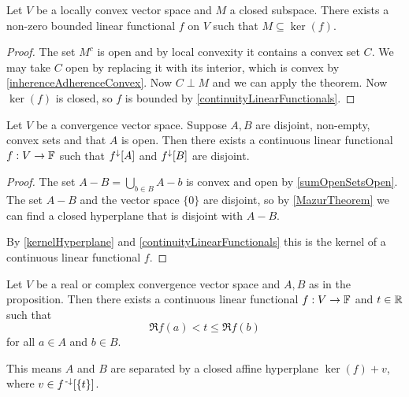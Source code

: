 \begin{corollary} \label{functionalZeroOnClosedSubSpace}
Let $V$ be a locally convex vector space and $M$ a closed subspace. There exists a non-zero bounded linear functional $f$ on $V$ such that $M\subseteq \ker(f)$.
\end{corollary}
\begin{proof}
The set $M^c$ is open and by local convexity it contains a convex set $C$. We may take $C$ open by replacing it with its interior, which is convex by \ref{inherenceAdherenceConvex}. Now $C\perp M$ and we can apply the theorem. Now $\ker(f)$ is closed, so $f$ is bounded by \ref{continuityLinearFunctionals}.
\end{proof}

\begin{theorem} \label{HahnBanachSeparation}
Let $V$ be a convergence vector space. Suppose $A,B$ are disjoint, non-empty, convex sets and that $A$ is open. Then there exists a continuous linear functional $f:V\to \mathbb{F}$ such that $f^\downarrow[A]$ and $f^\downarrow[B]$ are disjoint.
\end{theorem}
\begin{proof}
The set $A-B = \bigcup_{b\in B}A-b$ is convex and open by \ref{sumOpenSetsOpen}.
The set $A-B$ and the vector space $\{0\}$ are disjoint, so by \ref{MazurTheorem} we can find a closed hyperplane that is disjoint with $A-B$.

By \ref{kernelHyperplane} and \ref{continuityLinearFunctionals} this is the kernel of a continuous linear functional $f$.
\end{proof}
\begin{corollary} \label{separatingFunctionalOrderedImage}
Let $V$ be a real or complex convergence vector space and $A,B$ as in the proposition. Then there exists a continuous linear functional $f:V\to \mathbb{F}$ and $t\in \mathbb{R}$ such that
\[ \Re f(a) < t \leq \Re f(b) \]
for all $a\in A$ and $b\in B$.
\end{corollary}
This means $A$ and $B$ are separated by a closed affine hyperplane $\ker(f)+v$, where $v \in f^{\text{\hspace{0.15em}-}\downarrow}[\{t\}]$.

